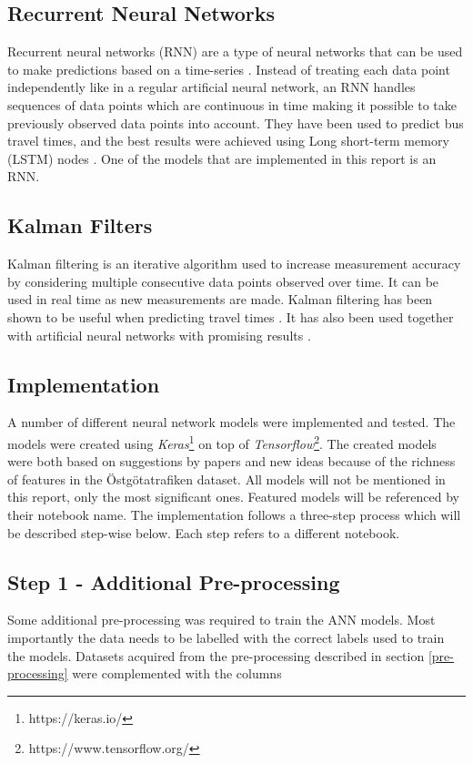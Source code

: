 \subsection{Recurrent Neural Networks}
Recurrent neural networks (RNN) are a type of neural networks that can be used to make predictions based on a time-series \cite{RNN}. Instead of treating each data point independently like in a regular artificial neural network, an RNN handles sequences of data points which are continuous in time making it possible to take previously observed data points into account. They have been used to predict bus travel times, and the best results were achieved using Long short-term memory (LSTM) nodes \cite{RNNBusPredictions}. One of the models that are implemented in this report is an RNN. 

\subsection{Kalman Filters}
Kalman filtering is an iterative algorithm used to increase measurement accuracy by considering multiple consecutive data points observed over time. It can be used in real time as new measurements are made. Kalman filtering has been shown to be useful when predicting travel times \cite{kalmanPrediction, brazilANN}. It has also been used together with artificial neural networks with promising results \cite{kalmanANN}.

\subsection{Implementation}
A number of different neural network models were implemented and tested. The models were created using \textit{Keras}\footnote{https://keras.io/} on top of \textit{Tensorflow}\footnote{https://www.tensorflow.org/}. The created models were both based on suggestions by papers and new ideas because of the richness of features in the Östgötatrafiken dataset. All models will not be mentioned in this report, only the most significant ones. Featured models will be referenced by their notebook name. The implementation follows a three-step process which will be described step-wise below. Each step refers to a different notebook.

\subsection{Step 1 - Additional Pre-processing}
Some additional pre-processing was required to train the ANN models. Most importantly the data needs to be labelled with the correct labels used to train the models. Datasets acquired from the pre-processing described in section \ref{pre-processing} were complemented with the columns

